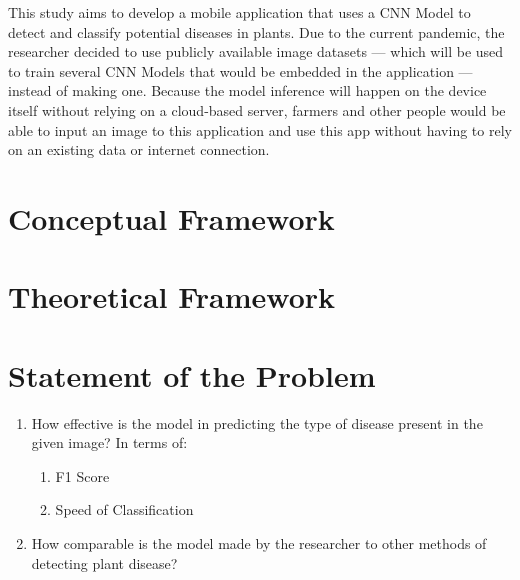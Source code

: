 This study aims to develop a mobile application that uses a 
CNN Model  to detect and classify potential diseases in 
plants. Due to the current pandemic, the researcher decided to use publicly 
available image datasets — which will be used to train several CNN Models 
that would be embedded in the application — instead of making one.
Because the model inference will
happen on the device itself without relying on a cloud-based server, 
farmers and other people would be able to input an image to this application 
and use this app without having to rely on an 
existing data or internet connection. 



\section{Conceptual Framework}

\section{Theoretical Framework}

\section{Statement of the Problem}

    \begin{enumerate}
    \item How effective is the model in predicting the
    type of disease present in the given image? 
    In terms of:

        \begin{enumerate}
            \item F1 Score 
            \item Speed of Classification 
        \end{enumerate}

    \item How comparable is the model made by the researcher 
    to other methods of detecting plant disease? 
    \end{enumerate}

